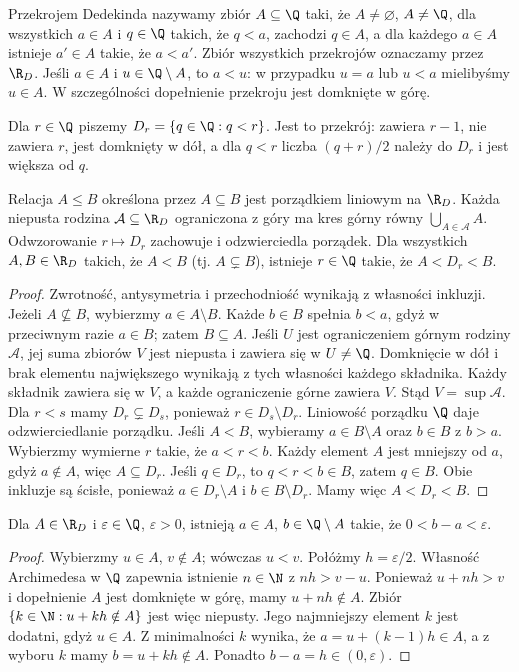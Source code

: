\begin{definicja}
\label{ma1:def:cut}
Przekrojem Dedekinda nazywamy zbiór $A\subseteq\Q$ taki, że $A\ne\varnothing$, $A\ne\Q$, dla wszystkich $a\in A$ i $q\in\Q$ takich, że $q<a$, zachodzi $q\in A$, a dla każdego $a\in A$ istnieje $a'\in A$ takie, że $a<a'$. Zbiór wszystkich przekrojów oznaczamy przez $\R_D$. Jeśli $a\in A$ i $u\in\Q\setminus A$, to $a<u$: w przypadku $u=a$ lub $u<a$ mielibyśmy $u\in A$. W szczególności dopełnienie przekroju jest domknięte w górę.
\end{definicja}
Dla $r\in\Q$ piszemy $D_r=\{q\in\Q:q<r\}$. Jest to przekrój: zawiera $r-1$, nie zawiera $r$, jest domknięty w dół, a dla $q<r$ liczba $(q+r)/2$ należy do $D_r$ i jest większa od $q$.
\begin{twierdzenie}
\label{ma1:thm:cut-complete}
Relacja $A\le B$ określona przez $A\subseteq B$ jest porządkiem liniowym na $\R_D$. Każda niepusta rodzina $\mathcal A\subseteq\R_D$ ograniczona z góry ma kres górny równy $\bigcup_{A\in\mathcal A}A$. Odwzorowanie $r\mapsto D_r$ zachowuje i odzwierciedla porządek. Dla wszystkich $A,B\in\R_D$ takich, że $A<B$ (tj. $A\subsetneq B$), istnieje $r\in\Q$ takie, że $A<D_r<B$.
\end{twierdzenie}
\begin{proof}
Zwrotność, antysymetria i przechodniość wynikają z własności inkluzji. Jeżeli $A\not\subseteq B$, wybierzmy $a\in A\setminus B$. Każde $b\in B$ spełnia $b<a$, gdyż w przeciwnym razie $a\in B$; zatem $B\subseteq A$. Jeśli $U$ jest ograniczeniem górnym rodziny $\mathcal A$, jej suma zbiorów $V$ jest niepusta i zawiera się w $U\ne\Q$. Domknięcie w dół i brak elementu największego wynikają z tych własności każdego składnika. Każdy składnik zawiera się w $V$, a każde ograniczenie górne zawiera $V$. Stąd $V=\sup\mathcal A$.
Dla $r<s$ mamy $D_r\subsetneq D_s$, ponieważ $r\in D_s\setminus D_r$. Liniowość porządku $\Q$ daje odzwierciedlanie porządku. Jeśli $A<B$, wybieramy $a\in B\setminus A$ oraz $b\in B$ z $b>a$. Wybierzmy wymierne $r$ takie, że $a<r<b$. Każdy element $A$ jest mniejszy od $a$, gdyż $a\notin A$, więc $A\subseteq D_r$. Jeśli $q\in D_r$, to $q<r<b\in B$, zatem $q\in B$. Obie inkluzje są ścisłe, ponieważ $a\in D_r\setminus A$ i $b\in B\setminus D_r$. Mamy więc $A<D_r<B$.
\end{proof}
\begin{lemat}
\label{ma1:lem:cut-bracket}
Dla $A\in\R_D$ i $\varepsilon\in\Q$, $\varepsilon>0$, istnieją $a\in A$, $b\in\Q\setminus A$ takie, że $0<b-a<\varepsilon$.
\end{lemat}
\begin{proof}
Wybierzmy $u\in A$, $v\notin A$; wówczas $u<v$. Połóżmy $h=\varepsilon/2$. Własność Archimedesa w $\Q$ zapewnia istnienie $n\in\N$ z $nh>v-u$. Ponieważ $u+nh>v$ i dopełnienie $A$ jest domknięte w górę, mamy $u+nh\notin A$. Zbiór $\{k\in\N:u+kh\notin A\}$ jest więc niepusty. Jego najmniejszy element $k$ jest dodatni, gdyż $u\in A$. Z minimalności $k$ wynika, że $a=u+(k-1)h\in A$, a z wyboru $k$ mamy $b=u+kh\notin A$. Ponadto $b-a=h\in(0,\varepsilon)$.
\end{proof}

